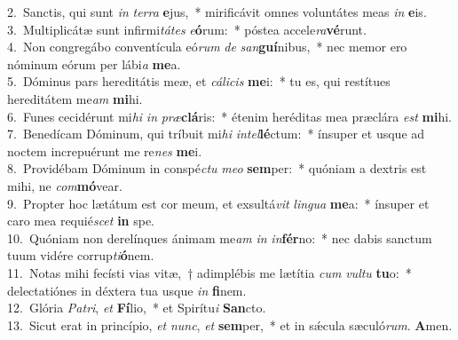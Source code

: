 {2.~}Sanctis, qui sunt \textit{in} \textit{ter}\textit{ra} \textbf{e}jus,~* mirificávit omnes voluntátes meas \textit{in} \textbf{e}is.\\
{3.~}Multiplicátæ sunt infirmi\textit{tá}\textit{tes} \textit{e}\textbf{ó}rum:~* póstea accele\textit{ra}\textbf{vé}runt.\\
{4.~}Non congregábo conventícula eó\textit{rum} \textit{de} \textit{san}\textbf{guí}nibus,~* nec memor ero nóminum eórum per lábi\textit{a} \textbf{me}a.\\
{5.~}Dóminus pars hereditátis meæ, et \textit{cá}\textit{li}\textit{cis} \textbf{me}i:~* tu es, qui restítues hereditátem me\textit{am} \textbf{mi}hi.\\
{6.~}Funes cecidérunt mi\textit{hi} \textit{in} \textit{præ}\textbf{clá}ris:~* étenim heréditas mea præclára \textit{est} \textbf{mi}hi.\\
{7.~}Benedícam Dóminum, qui tríbuit mi\textit{hi} \textit{in}\textit{tel}\textbf{lé}ctum:~* ínsuper et usque ad noctem increpuérunt me re\textit{nes} \textbf{me}i.\\
{8.~}Providébam Dóminum in conspé\textit{ctu} \textit{me}\textit{o} \textbf{sem}per:~* quóniam a dextris est mihi, ne \textit{com}\textbf{mó}vear.\\
{9.~}Propter hoc lætátum est cor meum, et exsultá\textit{vit} \textit{lin}\textit{gua} \textbf{me}a:~* ínsuper et caro mea requié\textit{scet} \textbf{in} spe.\\
{10.~}Quóniam non derelínques ánimam me\textit{am} \textit{in} \textit{in}\textbf{fér}no:~* nec dabis sanctum tuum vidére corrup\textit{ti}\textbf{ó}nem.\\
{11.~}Notas mihi fecísti vias vitæ,~† adimplébis me lætítia \textit{cum} \textit{vul}\textit{tu} \textbf{tu}o:~* delectatiónes in déxtera tua usque \textit{in} \textbf{fi}nem.\\
{12.~}Glória \textit{Pa}\textit{tri}, \textit{et} \textbf{Fí}lio,~* et Spirítu\textit{i} \textbf{San}cto.\\
{13.~}Sicut erat in princípio, \textit{et} \textit{nunc}, \textit{et} \textbf{sem}per,~* et in sǽcula sæculó\textit{rum}. \textbf{A}men.\\
